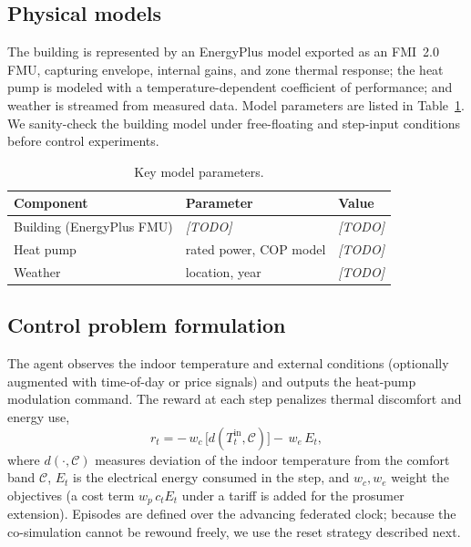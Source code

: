 \documentclass[preprint,review,12pt]{elsarticle}
\begin{document}
\subsection{Physical models}
The building is represented by an EnergyPlus model exported as an FMI~2.0 FMU,
capturing envelope, internal gains, and zone thermal response; the heat pump is
modeled with a temperature-dependent coefficient of performance; and weather is
streamed from measured data. Model parameters are listed in
Table~\ref{tab:params}. We sanity-check the building model under free-floating and
step-input conditions before control experiments.

\begin{table}[t]\centering
\caption{Key model parameters.}
\label{tab:params}
\small
\begin{tabular}{@{}lll@{}}
\toprule
Component & Parameter & Value \\
\midrule
Building (EnergyPlus FMU) & \textit{[TODO]} & \textit{[TODO]} \\
Heat pump & rated power, COP model & \textit{[TODO]} \\
Weather & location, year & \textit{[TODO]} \\
\bottomrule
\end{tabular}
\end{table}

\subsection{Control problem formulation}
The agent observes the indoor temperature and external conditions (optionally
augmented with time-of-day or price signals) and outputs the heat-pump modulation
command. The reward at each step penalizes thermal discomfort and energy use,
\begin{equation}
r_t = -\,w_c\,\big[d(T^{\text{in}}_t, \mathcal{C})\big]
      -\,w_e\,E_t ,
\label{eq:reward}
\end{equation}
where $d(\cdot,\mathcal{C})$ measures deviation of the indoor temperature from the
comfort band $\mathcal{C}$, $E_t$ is the electrical energy consumed in the step,
and $w_c, w_e$ weight the objectives (a cost term $w_p\,c_t E_t$ under a tariff is
added for the prosumer extension). Episodes are defined over the advancing
federated clock; because the co-simulation cannot be rewound freely, we use the
reset strategy described next.
\end{document}
